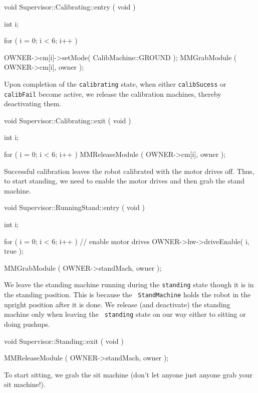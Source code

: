 \begin{codesegment}
void Supervisor::Calibrating::entry ( void ) {

  int i;

  for ( i = 0; i < 6; i++ ) {

    OWNER->cm[i]->setMode( CalibMachine::GROUND );
    MMGrabModule ( OWNER->cm[i], owner );

  }
}
\end{codesegment}

\noindent Upon completion of the {\tt calibrating} state, when either {\tt calibSucess}
or {\tt calibFail} become active, we release the calibration machines, thereby
deactivating them.

\begin{codesegment}
void Supervisor::Calibrating::exit ( void ) {

  int i;

  for ( i = 0; i < 6; i++ )
    MMReleaseModule ( OWNER->cm[i], owner );
}
\end{codesegment}

\noindent Successful calibration leaves the robot calibrated with the motor
drives off. Thus, to start standing, we need to enable the motor drives and
then grab the stand machine.

\begin{codesegment}
void Supervisor::RunningStand::entry ( void ) {

  int i;

  for ( i = 0; i < 6; i++ )  // enable motor drives
    OWNER->hw->driveEnable( i, true );
  
  MMGrabModule ( OWNER->standMach, owner );
}
\end{codesegment}

\noindent We leave the standing machine running during the {\tt standing}
state though it is in the standing position. This is because the {\tt
StandMachine} holds the robot in the upright position after it is done. We
release (and deactivate) the standing machine only when leaving the {\tt
standing} state on our way either to sitting or doing pushups.

\begin{codesegment}
void Supervisor::Standing::exit ( void ) {

  MMReleaseModule ( OWNER->standMach, owner );

}
\end{codesegment}

\noindent To start sitting, we grab the sit machine (don't let anyone just anyone grab
your sit machine!).

